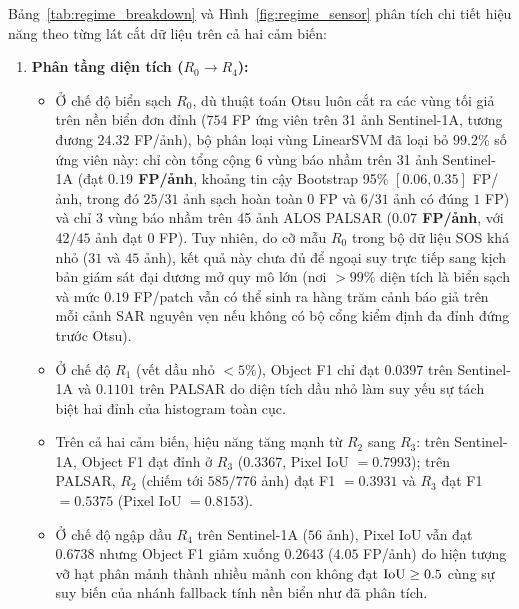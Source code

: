 Bảng~\ref{tab:regime_breakdown} và Hình~\ref{fig:regime_sensor} phân tích chi tiết hiệu năng theo từng lát cắt dữ liệu trên cả hai cảm biến:
\begin{enumerate}
    \item \textbf{Phân tầng diện tích ($R_0 \to R_4$):}
    \begin{itemize}
        \item Ở chế độ biển sạch $R_0$, dù thuật toán Otsu luôn cắt ra các vùng tối giả trên nền biển đơn đỉnh ($754$ FP ứng viên trên 31 ảnh Sentinel-1A, tương đương $24.32$ FP/ảnh), bộ phân loại vùng LinearSVM đã loại bỏ $99.2\%$ số ứng viên này: chỉ còn tổng cộng $6$ vùng báo nhầm trên 31 ảnh Sentinel-1A (đạt \textbf{$0.19$ FP/ảnh}, khoảng tin cậy Bootstrap 95\% $[0.06, 0.35]$ FP/ảnh, trong đó $25/31$ ảnh sạch hoàn toàn $0$ FP và $6/31$ ảnh có đúng $1$ FP) và chỉ $3$ vùng báo nhầm trên 45 ảnh ALOS PALSAR (\textbf{$0.07$ FP/ảnh}, với $42/45$ ảnh đạt $0$ FP). Tuy nhiên, do cỡ mẫu $R_0$ trong bộ dữ liệu SOS khá nhỏ ($31$ và $45$ ảnh), kết quả này chưa đủ để ngoại suy trực tiếp sang kịch bản giám sát đại dương mở quy mô lớn (nơi $>99\%$ diện tích là biển sạch và mức $0.19$ FP/patch vẫn có thể sinh ra hàng trăm cảnh báo giả trên mỗi cảnh SAR nguyên vẹn nếu không có bộ cổng kiểm định đa đỉnh đứng trước Otsu).
        \item Ở chế độ $R_1$ (vết dầu nhỏ $<5\%$), Object F1 chỉ đạt $0.0397$ trên Sentinel-1A và $0.1101$ trên PALSAR do diện tích dầu nhỏ làm suy yếu sự tách biệt hai đỉnh của histogram toàn cục.
        \item Trên cả hai cảm biến, hiệu năng tăng mạnh từ $R_2$ sang $R_3$: trên Sentinel-1A, Object F1 đạt đỉnh ở $R_3$ ($0.3367$, Pixel IoU $= 0.7993$); trên PALSAR, $R_2$ (chiếm tới $585/776$ ảnh) đạt F1 $= 0.3931$ và $R_3$ đạt F1 $= 0.5375$ (Pixel IoU $= 0.8153$).
        \item Ở chế độ ngập dầu $R_4$ trên Sentinel-1A ($56$ ảnh), Pixel IoU vẫn đạt $0.6738$ nhưng Object F1 giảm xuống $0.2643$ ($4.05$ FP/ảnh) do hiện tượng vỡ hạt phân mảnh thành nhiều mảnh con không đạt $\mathrm{IoU} \ge 0.5$ cùng sự suy biến của nhánh fallback tính nền biển như đã phân tích.
    \end{itemize}

\end{enumerate}
